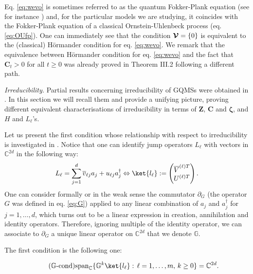 \documentclass[preprint]{elsarticle}
\theoremstyle{definition}
\def\CC{\mathbb{C}}
\begin{document}
Eq. \eqref{eq:wevo} is sometimes referred to as the quantum Fokker-Plank equation (see for instance \cite{AF08}) and, for the particular models we are studying, it coincides with the Fokker-Plank equation of a classical Ornstein-Uhlenbeck process (eq. \eqref{eq:OUfp}). One can immediately see that the condition $\boldsymbol{\cal V}=\{0\}$ is equivalent to the (classical) H\"ormander condition for eq. \eqref{eq:wevo}. We remark that the equivalence between H\"ormander condition for eq. \eqref{eq:wevo} and the fact that $\mathbf{C}_t>0$ for all $t \geq 0$ was already proved in Theorem III.2 \cite{SP23} following a different path.

\bigskip \textit{Irreducibility.} Partial results concerning irreducibility of GQMSs were obtained in \cite{AFP21,FP22,AFP22b,GP26}. In this section we will recall them and provide a unifying picture, proving different equivalent characterisations of irreducibility in terms of $\mathbf{Z}$, $\mathbf{C}$ and $\boldsymbol{\zeta}$, and $H$ and $L_\ell$'s. 

Let us present the first condition whose relationship with respect to irreducibility is investigated in \cite{AFP21,FP22,AFP22b}. Notice that one can identify jump operators $L_\ell$ with vectors in $\CC^{2d}$ in the following way:
$$L_\ell=\sum_{j=1}^{d}\overline{v}_{\ell j}a_j+u_{\ell j}a_j^\dagger \Leftrightarrow \ket{l_\ell}:=\begin{pmatrix}\overline{V}^{(\ell)T}\\
U^{(\ell)T}\end{pmatrix}.$$
One can consider formally or in the weak sense the commutator $\partial_G$ (the operator $G$ was defined in eq. \eqref{eq:G}) applied to any linear combination of $a_j$ and $a^\dagger_j$ for $j=1,\dots, d$, which turns out to be a linear expression in creation, annihilation and identity operators. Therefore, ignoring multiple of the identity operator, we can associate to $\partial_G$  a unique linear operator on $\CC^{2d}$ that we denote $\mathbb{G}$.

The first condition is the following one:

\begin{equation} \tag{$\mathbb{G}$-cond} \label{eq:Gcond}
{\rm span}_{\CC}\{\mathbb{G}^{k}\ket{l_\ell}: \, \ell=1, \dots, m, \, k\geq 0\}=\CC^{2d}.
\end{equation}
\end{document}
